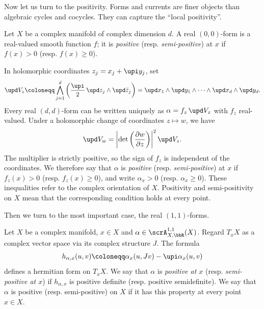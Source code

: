 Now let us turn to the positivity.
Forms and currents are  finer objects than algebraic cycles and cocycles.
They can capture the ``local positivity''.

\begin{construction}[label=\labelNFM{constr:positivity-of-00-and-dd-froms}, status=draft, tag=0000000]
	Let $X$ be a complex manifold of complex dimension $d$.
	A real $(0,0)$-form is a real-valued smooth function $f$;
	it is \emph{positive} (resp. \emph{semi-positive}) at $x$ if $f(x) > 0$ (resp. $f(x) \geq 0$).

	In holomorphic coordinates $z_j = x_j + \upi y_j$, set
	\[ \upd V_z \coloneqq \bigwedge_{j = 1}^d\left(\frac{\upi}{2}\,\upd z_j \wedge \upd\bar z_j\right) = \upd x_1 \wedge \upd y_1 \wedge \cdots \wedge \upd x_d \wedge \upd y_d. \]
	Every real $(d,d)$-form can be written uniquely as $\alpha = f_z\,\upd V_z$ with $f_z$ real-valued.
	Under a holomorphic change of coordinates $z \mapsto w$, we have
	\[ \upd V_w = \left|\det\left(\frac{\partial w}{\partial z}\right)\right|^2 \upd V_z. \]
	The multiplier is strictly positive, so the sign of $f_z$ is independent of the coordinates.
	We therefore say that $\alpha$ is \emph{positive} (resp. \emph{semi-positive}) at $x$
	if $f_z(x) > 0$ (resp. $f_z(x) \geq 0$), and write $\alpha_x > 0$ (resp. $\alpha_x \geq 0$).
	These inequalities refer to the complex orientation of $X$.
	Positivity and semi-positivity on $X$ mean that the corresponding condition holds at every point.
\end{construction}

Then we turn to the most important case, the real $(1,1)$-forms.

\begin{definition}[label=\labelNFM{def:positivity-of-11-forms}, status=draft, tag=0000000]
	Let $X$ be a complex manifold, $x \in X$ and $\alpha \in \scrA_{X,\bbR}^{1,1}(X)$.
	Regard $T_xX$ as a complex vector space via its complex structure $J$.
	The formula
	\[ h_{\alpha,x}(u,v) \coloneqq \alpha_x(u,Jv) - \upi\alpha_x(u,v) \]
	defines a hermitian form on $T_xX$.
	We say that $\alpha$ is \emph{positive at $x$} (resp. \emph{semi-positive at $x$}) if $h_{\alpha,x}$ is positive definite (resp. positive semidefinite).
	We say that $\alpha$ is positive (resp. semi-positive) on $X$ if it has this property at every point $x \in X$.
\end{definition}

